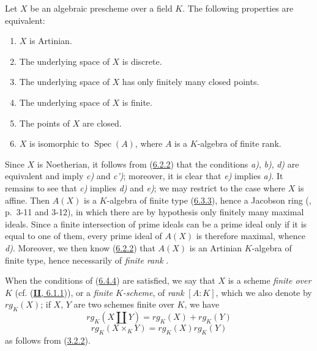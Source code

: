 \begin{proposition}[6.4.4]
\label{I.6.4.4}
Let $X$ be an algebraic prescheme over a field $K$. The following properties
are equivalent:
\begin{enumerate}
  \item[\textup{a)}] $X$ is Artinian.
  \item[\textup{b)}] The underlying space of $X$ is discrete.
  \item[\textup{c)}] The underlying space of $X$ has only finitely many closed
    points.
  \item[\textup{c')}] The underlying space of $X$ is finite.
  \item[\textup{d)}] The points of $X$ are closed.
  \item[\textup{e)}] $X$ is isomorphic to $\operatorname{Spec}(A)$, where $A$ is a
    $K$-algebra of finite rank.
\end{enumerate}
\end{proposition}

Since $X$ is Noetherian, it follows from (\hyperref[I.6.2.2]{6.2.2}) that
the conditions \emph{a)}, \emph{b)}, \emph{d)} are equivalent and imply \emph{c)} and \emph{c')}; moreover,
it is clear that \emph{e)} implies \emph{a)}. It remains to see that \emph{c)} implies \emph{d)} and
\emph{e)}; we may restrict to the case where $X$ is affine. Then $A(X)$ is a
$K$-algebra of finite type (\hyperref[I.6.3.3]{6.3.3}), hence a Jacobson
ring (\cite{I-1}, p.~3-11 and 3-12), in which there are by hypothesis
only finitely many maximal ideals. Since a finite intersection of prime
ideals can be a prime ideal only if it is equal to one of them,
every prime ideal of $A(X)$ is therefore maximal, whence \emph{d)}. Moreover, we
then know (\hyperref[I.6.2.2]{6.2.2}) that $A(X)$ is an Artinian
$K$-algebra of finite type, hence necessarily of \emph{finite rank}
\cite{I-21}.

\begin{env}[6.4.5]
\label{I.6.4.5}
When the conditions of (\hyperref[I.6.4.4]{6.4.4}) are satisfied,
we say that $X$ is a scheme \emph{finite over $K$}
(cf. (\hyperref[II.6.1.1]{\textbf{II}, 6.1.1})), or a
\emph{finite $K$-scheme}, of \emph{rank} $[A:K]$, which we also denote by
$\mathit{rg}_K(X)$; if $X$, $Y$ are two schemes finite over $K$, we
have
\[
  \mathit{rg}_K(X\amalg Y)
  =\mathit{rg}_K(X)+\mathit{rg}_K(Y)
  \tag{6.4.5.1}\label{I.6.4.5.1}
\]
\[
  \mathit{rg}_K(X\times_K Y)
  =\mathit{rg}_K(X)\mathit{rg}_K(Y)
  \tag{6.4.5.2}\label{I.6.4.5.2}
\]
as follows from (\hyperref[I.3.2.2]{3.2.2}).
\end{env}

